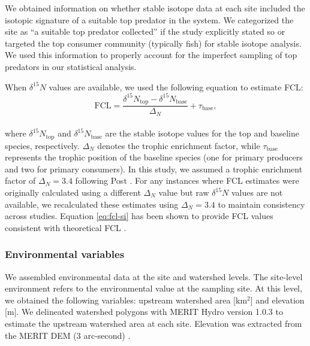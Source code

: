 \documentclass[9pt,twocolumn,twoside]{pnas-new}
\begin{document}
We obtained information on whether stable isotope data at each site included the isotopic signature of a suitable top predator in the system.
We categorized the site as ``a suitable top predator collected'' if the study explicitly stated so or targeted the top consumer community (typically fish) for stable isotope analysis.
We used this information to properly account for the imperfect sampling of top predators in our statistical analysis.

When $\delta^{15}N$ values are available, we used the following equation to estimate FCL:
\\
\begin{equation}
    \mbox{FCL} = \frac{\delta^{15}N_{\text{top}} - \delta^{15}N_{\text{base}}}{\Delta_N} + \tau_{\text{base}},
    \label{eq:fcl-si}
\end{equation}
\\
where $\delta^{15}N_{\text{top}}$ and $\delta^{15}N_{\text{base}}$ are the stable isotope values for the top and baseline species, respectively.
$\Delta_{N}$ denotes the trophic enrichment factor, while $\tau_{\text{base}}$ represents the trophic position of the baseline species (one for primary producers and two for primary consumers). 
In this study, we assumed a trophic enrichment factor of $\Delta_{N} = 3.4$ following Post \citep{post_using_2002}.
For any instances where FCL estimates were originally calculated using a different $\Delta_{N}$ value but raw $\delta^{15}N$ values are not available, we recalculated these estimates using $\Delta_{N} = 3.4$ to maintain consistency across studies.
Equation \ref{eq:fcl-si} has been shown to provide FCL values consistent with theoretical FCL \citep{vagnon_integrating_2026}.

\subsubsection*{Environmental variables}

We assembled environmental data at the site and watershed levels.
The site-level environment refers to the environmental value at the sampling site.
At this level, we obtained the following variables: upstream watershed area [km$^2$] and elevation [m].
We delineated watershed polygons with MERIT Hydro version 1.0.3 \citep{yamazaki_merit_2019} to estimate the upstream watershed area at each site.
Elevation was extracted from the MERIT DEM (3 arc-second) \citep{yamazaki_high-accuracy_2017}.
\end{document}

